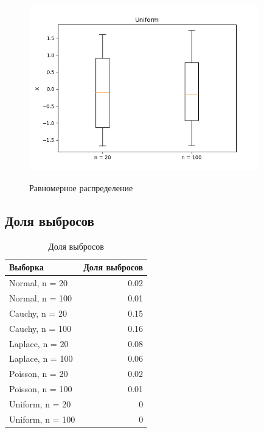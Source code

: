 \documentclass[../body.tex]{subfiles}
\begin{document}
\begin{figure}[H]
	\centering
	\includegraphics[width = 10cm, height = 8cm]{img/Uniform_boxplot.png}
	\caption{Равномерное распределение}
	\label{fig:uniform_boxplot}
\end{figure}

\subsection{Доля выбросов}
\begin{table}[H]
	\centering
	\begin{tabular}{lr}
		\hline
		Выборка          &   Доля выбросов \\
		\hline
		Normal, n = 20   &            0.02 \\
		Normal, n = 100  &            0.01 \\
		Cauchy, n = 20   &            0.15 \\
		Cauchy, n = 100  &            0.16 \\
		Laplace, n = 20  &            0.08 \\
		Laplace, n = 100 &            0.06 \\
		Poisson, n = 20  &            0.02 \\
		Poisson, n = 100 &            0.01 \\
		Uniform, n = 20  &            0    \\
		Uniform, n = 100 &            0    \\
		\hline
	\end{tabular}
	\caption{Доля выбросов}
	\label{tab:outliers}
\end{table}
\end{document}
